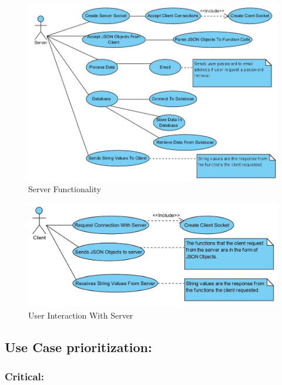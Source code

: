 \documentclass[letterpaper]{article}
\begin{document}
					\begin{figure}[H]
					\centering
					\includegraphics[width=140mm]{UML_Diagram/Use_Case/Server.jpg}
					\caption{Server Functionality}
					\end{figure}
					
					\begin{figure}[H]
					\centering
					\includegraphics[width=140mm]{UML_Diagram/Use_Case/Client.jpg}
					\caption{User Interaction With Server}
					\end{figure}
				
			\vspace{0.2in}
			\subsection*{Use Case prioritization:}
			\vspace{0.1in}
					
				\subsubsection*{Critical:}
				\vspace{0.1in}
					
\end{document}
